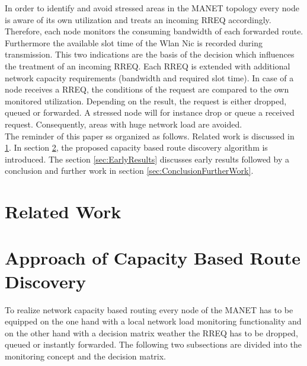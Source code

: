 \documentclass[conference]{IEEEtran}
\newcommand{\MANET}{MANET}
\begin{document}
In order to identify and avoid stressed areas in the \MANET{} topology every node is aware of its own utilization and treats an incoming RREQ accordingly. Therefore, each node monitors the consuming bandwidth of each forwarded route. Furthermore the available slot time of the Wlan Nic is recorded during transmission. This two indications are the basis of the decision which influences the treatment of an incoming RREQ. Each RREQ is extended with additional network capacity requirements  (bandwidth and required slot time). In case of a node receives a RREQ, the conditions of the request are compared to the own monitored utilization. Depending on the result, the request is either dropped, queued or forwarded. A stressed node will for instance drop or queue a received request. Consequently, areas with huge network load are avoided.\\
The reminder of this paper ss organized as follows. Related work is discussed in \ref{sec:RelatedWork}. In section \ref{sec:CapBasedRoutingAlgorithm}, the proposed capacity based route discovery algorithm is introduced. The section \ref{sec:EarlyResults} discusses early results followed by a conclusion and further work in section \ref{sec:ConclusionFurtherWork}.

\section{Related Work}\label{sec:RelatedWork}

\section{Approach of Capacity Based Route Discovery}\label{sec:CapBasedRoutingAlgorithm}
To realize network capacity based routing every node of the \MANET{} has to be equipped on the one hand with a local network load monitoring functionality and on the other hand with a decision matrix weather the RREQ has to be dropped, queued or instantly forwarded. The following two subsections are divided into the monitoring concept and the decision matrix.
	
\end{document}
